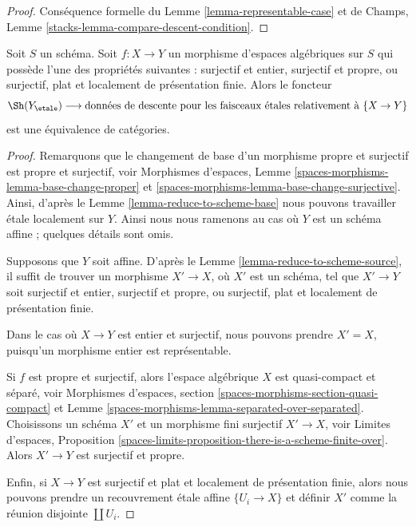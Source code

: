 \begin{proof}
Conséquence formelle du Lemme \ref{lemma-representable-case}
et de Champs, Lemme \ref{stacks-lemma-compare-descent-condition}.
\end{proof}

\begin{lemma}
\label{lemma-glue-etale-sheaf-proper-surjective}
Soit $S$ un schéma. Soit $f : X \to Y$ un morphisme d'espaces algébriques sur $S$ qui possède l'une des propriétés suivantes : surjectif et entier, surjectif et propre, ou surjectif, plat et localement de présentation finie. Alors le foncteur $$
\Sh(Y_\etale)
\longrightarrow
\text{données de descente pour les faisceaux \'etales relativement à }\{X \to Y\}
$$ est une équivalence de catégories.
\end{lemma}

\begin{proof}
Remarquons que le changement de base d'un morphisme propre et surjectif est
propre et surjectif, voir
Morphismes d'espaces, Lemme \ref{spaces-morphisms-lemma-base-change-proper}
et \ref{spaces-morphisms-lemma-base-change-surjective}.
Ainsi, d'après le Lemme \ref{lemma-reduce-to-scheme-base}
nous pouvons travailler \'etale localement sur $Y$. Ainsi
nous nous ramenons au cas où $Y$ est un schéma affine ; quelques détails sont omis.

\medskip\noindent
Supposons que $Y$ soit affine. D'après le Lemme \ref{lemma-reduce-to-scheme-source},
il suffit de trouver un morphisme $X' \to X$, où $X'$ est un schéma, tel que $X' \to Y$ soit surjectif et entier, surjectif et propre, ou surjectif, plat et localement de présentation finie.

\medskip\noindent
Dans le cas où $X \to Y$ est entier et surjectif, nous pouvons prendre $X' = X$,
puisqu'un morphisme entier est représentable.

\medskip\noindent
Si $f$ est propre et surjectif, alors l'espace algébrique
$X$ est quasi-compact et séparé, voir
Morphismes d'espaces, section \ref{spaces-morphisms-section-quasi-compact} et
Lemme \ref{spaces-morphisms-lemma-separated-over-separated}.
Choisissons un schéma $X'$ et un morphisme fini surjectif $X' \to X$, voir
Limites d'espaces, Proposition
\ref{spaces-limits-proposition-there-is-a-scheme-finite-over}.
Alors $X' \to Y$ est surjectif et propre.

\medskip\noindent
Enfin, si $X \to Y$ est surjectif et plat et localement de présentation finie, alors nous pouvons prendre un recouvrement \'etale affine $\{U_i \to X\}$ et définir $X'$ comme la réunion disjointe $\coprod U_i$.
\end{proof}

